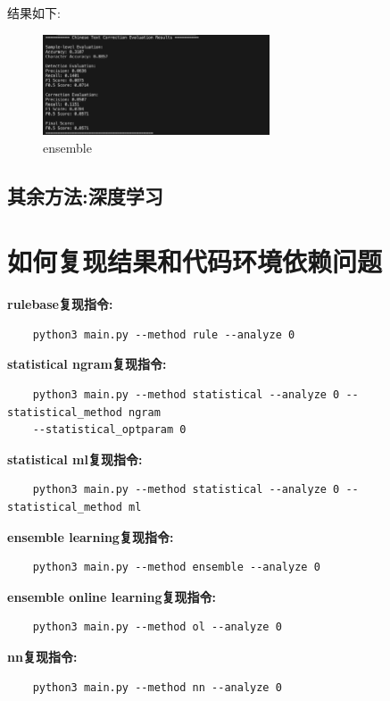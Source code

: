 \documentclass[answers]{exam}  %
\begin{document}
结果如下:

\begin{figure}[H]
    \centering
    \label{ensemble}
    \includegraphics[width=0.6\textwidth]{../pic/ensemble.png} 
    \caption{ensemble}  
\end{figure}

\subsection{其余方法:深度学习}

\section{如何复现结果和代码环境依赖问题}
\textbf{rulebase复现指令:}
\begin{lstlisting}
    python3 main.py --method rule --analyze 0  
\end{lstlisting}

\textbf{statistical ngram复现指令:}
\begin{lstlisting}
    python3 main.py --method statistical --analyze 0 --statistical_method ngram 
    --statistical_optparam 0
\end{lstlisting}

\textbf{statistical ml复现指令:}
\begin{lstlisting}
    python3 main.py --method statistical --analyze 0 --statistical_method ml 
\end{lstlisting}

\textbf{ensemble learning复现指令:}
\begin{lstlisting}
    python3 main.py --method ensemble --analyze 0
\end{lstlisting}

\textbf{ensemble online learning复现指令:}
\begin{lstlisting}
    python3 main.py --method ol --analyze 0
\end{lstlisting}

\textbf{nn复现指令:}
\begin{lstlisting}
    python3 main.py --method nn --analyze 0 
\end{lstlisting}
\end{document}
